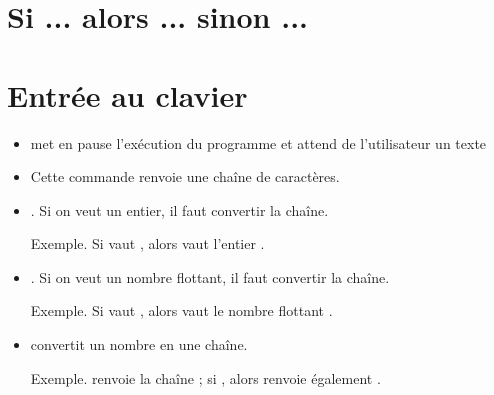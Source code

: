 \documentclass[11pt,class=report,crop=false]{standalone}
\begin{document}




\newpage
\section*{Si ... alors ... sinon ...}



\newpage


\section*{Entrée au clavier}


\begin{itemize}
  \item {} met en pause l'exécution du programme et attend de l'utilisateur un texte
  
  \bigskip
  
  \item Cette commande renvoie une chaîne de caractères.
   
  \bigskip
   
  \item {}. Si on veut un entier, il faut convertir la chaîne. 
  
  
  Exemple. Si  vaut  , alors  vaut l'entier . 


  \bigskip
   
  \item {}. Si on veut un nombre flottant, il faut convertir la chaîne. 
  
  
  Exemple. Si  vaut  , alors  vaut le nombre flottant . 
     
  \bigskip
   
  \item {} convertit un nombre en une chaîne. 
  
  Exemple.   renvoie la chaîne  ; si , alors  renvoie également .
\end{itemize}


\newpage
\end{document}
